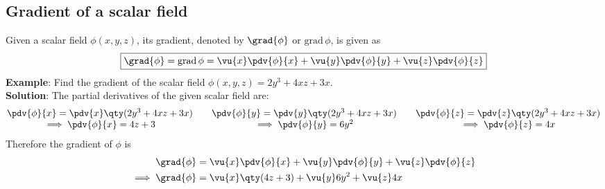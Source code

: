 	\subsection{Gradient of a scalar field}
		Given a scalar field $\phi(x,y,z)$, its gradient, denoted by $\grad{\phi}$ or $\text{grad}\,\phi$, is given as
		\begin{align*}
			\boxed{\grad{\phi}=\text{grad}\,\phi=\vu{x}\pdv{\phi}{x}+\vu{y}\pdv{\phi}{y}+\vu{z}\pdv{\phi}{z}}
		\end{align*}
		\textbf{Example}: Find the gradient of the scalar field $\phi(x,y,z)=2y^3+4xz+3x$.\\
		\textbf{Solution}: The partial derivatives of the given scalar field are:
		\begin{align*}
			\begin{matrix}
				{\pdv{\phi}{x}=\pdv{x}\qty(2y^3+4xz+3x)} & {} & {\pdv{\phi}{y}=\pdv{y}\qty(2y^3+4xz+3x)} & {} & {\pdv{\phi}{z}=\pdv{z}\qty(2y^3+4xz+3x)} \\
				{\implies\pdv{\phi}{x}=4z+3} & {} & {\implies\pdv{\phi}{y}=6y^2} & {} & {\implies\pdv{\phi}{z}=4x}
			\end{matrix}
		\end{align*}
		Therefore the gradient of $\phi$ is
		\begin{align*}
			\grad{\phi}&=\vu{x}\pdv{\phi}{x}+\vu{y}\pdv{\phi}{y}+\vu{z}\pdv{\phi}{z} \\
			\implies\grad{\phi}&=\vu{x}\qty(4z+3)+\vu{y}6y^2+\vu{z}4x
		\end{align*}
		
